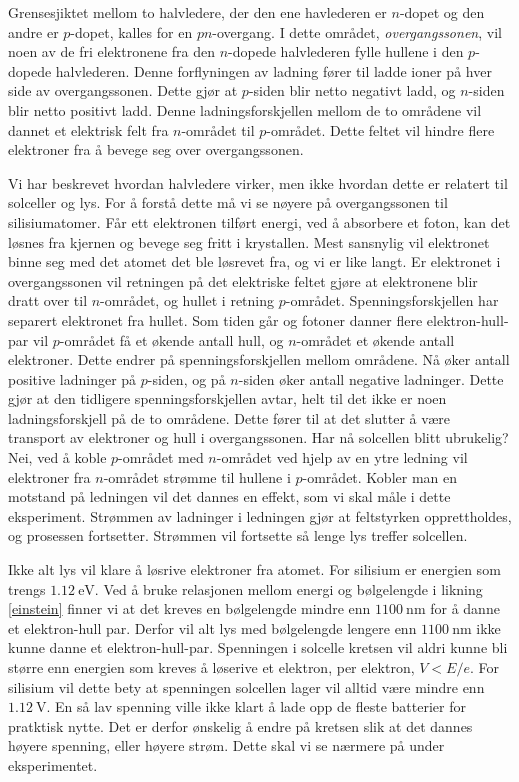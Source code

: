 \documentclass[%
 reprint,
 amsmath,amssymb,
 aps,
 norsk,
 booktabs
]{revtex4-1}
\begin{document}
Grensesjiktet mellom to halvledere, der den ene havlederen er $n$-dopet og den andre er $p$-dopet, kalles for en $pn$-overgang. I dette området, \textit{overgangssonen}, vil noen av de fri elektronene fra den $n$-dopede halvlederen fylle hullene i den $p$-dopede halvlederen. Denne forflyningen av ladning fører til ladde ioner på hver side av overgangssonen. Dette gjør at $p$-siden blir netto negativt ladd, og $n$-siden blir netto positivt ladd. Denne ladningsforskjellen mellom de to områdene vil dannet et elektrisk felt fra $n$-området til $p$-området. Dette feltet vil hindre flere elektroner fra å bevege seg over overgangssonen.\par
Vi har beskrevet hvordan halvledere virker, men ikke hvordan dette er relatert til solceller og lys. For å  forstå dette må vi se nøyere på overgangssonen til silisiumatomer. Får ett elektronen tilført energi, ved å absorbere et foton, kan det løsnes fra kjernen og bevege seg fritt i krystallen. Mest sansnylig vil elektronet binne seg med det atomet det ble løsrevet fra, og vi er like langt. Er elektronet i overgangssonen vil retningen på det elektriske feltet gjøre at elektronene blir dratt over til $n$-området, og hullet i retning $p$-området. Spenningsforskjellen har separert elektronet fra hullet. Som tiden går og fotoner danner flere elektron-hull-par vil $p$-området få et økende antall hull, og $n$-området et økende antall elektroner. Dette endrer på spenningsforskjellen mellom områdene. Nå øker antall positive ladninger på $p$-siden, og på $n$-siden øker antall negative ladninger. Dette gjør at den tidligere spenningsforskjellen avtar, helt til det ikke er noen ladningsforskjell på de to områdene. Dette fører til at det slutter å være transport av elektroner og hull i overgangssonen. Har nå solcellen blitt ubrukelig? Nei, ved å koble $p$-området med $n$-området ved hjelp av en ytre ledning vil elektroner fra $n$-området strømme til hullene i $p$-området. Kobler man en motstand på ledningen vil det dannes en effekt, som vi skal måle i dette eksperiment. Strømmen av ladninger i ledningen gjør at feltstyrken opprettholdes, og prosessen fortsetter. Strømmen vil fortsette så lenge lys treffer solcellen.\par
Ikke alt lys vil klare å løsrive elektroner fra atomet. For silisium er energien som trengs $\SI{1.12}{\electronvolt}$. Ved å bruke relasjonen mellom energi og bølgelengde i likning \eqref{einstein} finner vi at det kreves en bølgelengde mindre enn $\SI{1100}{\nano\meter}$ for å danne et elektron-hull par. Derfor vil alt lys med bølgelengde lengere enn $\SI{1100}{\nano\meter}$ ikke kunne danne et elektron-hull-par. Spenningen i solcelle kretsen vil aldri kunne bli større enn energien som kreves å løserive et elektron, per elektron, $V<E/e$. For silisium vil dette bety at spenningen solcellen lager vil alltid være mindre enn $\SI{1.12}{\volt}$. En så lav spenning ville ikke klart å lade opp de fleste batterier for pratktisk nytte. Det er derfor ønskelig å endre på kretsen slik at det dannes høyere spenning, eller høyere strøm. Dette skal vi se nærmere på under eksperimentet.
\end{document}
